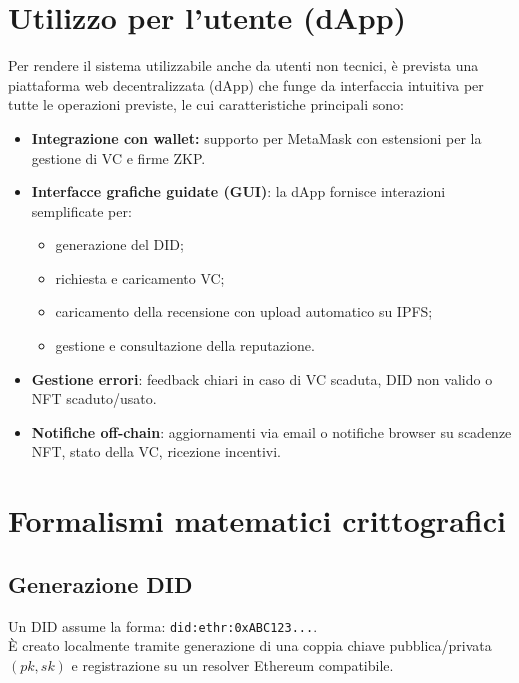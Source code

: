     \section{Utilizzo per l'utente (dApp)}
        Per rendere il sistema utilizzabile anche da utenti non tecnici, è prevista una piattaforma web decentralizzata (dApp) che funge da interfaccia intuitiva per tutte le operazioni previste, le cui caratteristiche principali sono:
            \begin{itemize}
                \item \textbf{Integrazione con wallet:} supporto per MetaMask con estensioni per la gestione di VC e firme ZKP.
                
                \item \textbf{Interfacce grafiche guidate (GUI)}: la dApp fornisce interazioni semplificate per:
                    \begin{itemize}
                        \item generazione del DID;
    
                        \item richiesta e caricamento VC;
                        
                        \item caricamento della recensione con upload automatico su IPFS;
                        
                        \item gestione e consultazione della reputazione.
                    \end{itemize}
    
                \item \textbf{Gestione errori}: feedback chiari in caso di VC scaduta, DID non valido o NFT scaduto/usato.
                
                \item \textbf{Notifiche off-chain}: aggiornamenti via email o notifiche browser su scadenze NFT, stato della VC, ricezione incentivi.
            \end{itemize}

    \section{Formalismi matematici crittografici}
        \subsection{Generazione DID}
            Un DID assume la forma: \texttt{did:ethr:0xABC123...}. \\
            È creato localmente tramite generazione di una coppia chiave pubblica/privata \((pk, sk)\) e registrazione su un resolver Ethereum compatibile.

